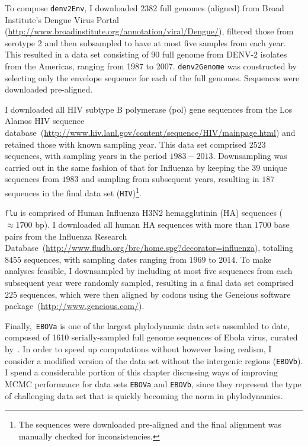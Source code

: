 To compose \verb|denv2Env|, I downloaded  $2382$ full genomes (aligned) from Broad Institute's Dengue Virus Portal (\url{http://www.broadinstitute.org/annotation/viral/Dengue/}), filtered those from serotype 2 and then subsampled to have at most five samples from each year.
This resulted in a data set consisting of $90$ full genome from DENV-2 isolates from the Americas, ranging from 1987 to 2007.
\verb|denv2Genome| was constructed by selecting only the envelope sequence for each of the full genomes.
Sequences were downloaded pre-aligned.

I downloaded all HIV subtype B polymerase (pol) gene sequences from the Los Alamos HIV sequence database~(\url{http://www.hiv.lanl.gov/content/sequence/HIV/mainpage.html}) and retained those with known sampling year.
This data set comprised $2523$ sequences, with sampling years in the period $1983-2013$.
Downsampling was carried out in the same fashion of that for Influenza by keeping the $39$ unique sequences from $1983$ and sampling from subsequent years, resulting in $187$ sequences in the final data set (\verb|HIV|)\footnote{The sequences were downloaded pre-aligned and the final alignment was manually checked for inconsistencies.}.

\verb|flu| is comprised of Human Influenza H3N2 hemagglutinin (HA) sequences ($\approx 1700$ bp).
I downloaded all human HA sequences with more than $1700$ base pairs from the Influenza Research Database~(\url{http://www.fludb.org/brc/home.spg?decorator=influenza}), totalling $8455$ sequences, with sampling dates ranging from $1969$ to $2014$. 
To make analyses feasible, I downsampled by including at most five sequences from each subsequent year were randomly sampled, resulting in a final data set comprised $225$ sequences, which were then aligned by codons using the Geneious software package~(\url{http://www.geneious.com/}).

Finally,~\verb|EBOVa| is one of the largest phylodynamic data sets assembled to date, composed of 1610 serially-sampled full genome sequences of Ebola virus, curated by~\citep{Dudas2017}.
In order to speed up computations without however losing realism, I consider a modified version of the data set without the intergenic regions (\verb|EBOVb|).
I spend a considerable portion of this chapter discussing ways of improving MCMC performance for data sets \verb|EBOVa| and \verb|EBOVb|, since they represent the type of challenging data set that is quickly becoming the norm in phylodynamics.

